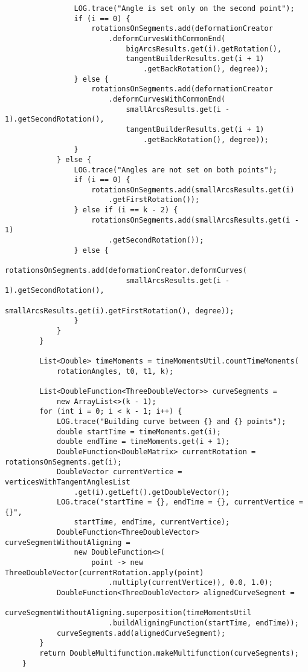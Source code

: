 \begin{verbatim}
                LOG.trace("Angle is set only on the second point");
                if (i == 0) {
                    rotationsOnSegments.add(deformationCreator
                        .deformCurvesWithCommonEnd(
                            bigArcsResults.get(i).getRotation(),
                            tangentBuilderResults.get(i + 1)
                                .getBackRotation(), degree));
                } else {
                    rotationsOnSegments.add(deformationCreator
                        .deformCurvesWithCommonEnd(
                            smallArcsResults.get(i - 1).getSecondRotation(),
                            tangentBuilderResults.get(i + 1)
                                .getBackRotation(), degree));
                }
            } else {
                LOG.trace("Angles are not set on both points");
                if (i == 0) {
                    rotationsOnSegments.add(smallArcsResults.get(i)
                        .getFirstRotation());
                } else if (i == k - 2) {
                    rotationsOnSegments.add(smallArcsResults.get(i - 1)
                        .getSecondRotation());
                } else {
                    rotationsOnSegments.add(deformationCreator.deformCurves(
                            smallArcsResults.get(i - 1).getSecondRotation(),
                            smallArcsResults.get(i).getFirstRotation(), degree));
                }
            }
        }

        List<Double> timeMoments = timeMomentsUtil.countTimeMoments(
            rotationAngles, t0, t1, k);

        List<DoubleFunction<ThreeDoubleVector>> curveSegments =
            new ArrayList<>(k - 1);
        for (int i = 0; i < k - 1; i++) {
            LOG.trace("Building curve between {} and {} points");
            double startTime = timeMoments.get(i);
            double endTime = timeMoments.get(i + 1);
            DoubleFunction<DoubleMatrix> currentRotation = rotationsOnSegments.get(i);
            DoubleVector currentVertice = verticesWithTangentAnglesList
                .get(i).getLeft().getDoubleVector();
            LOG.trace("startTime = {}, endTime = {}, currentVertice = {}",
                startTime, endTime, currentVertice);
            DoubleFunction<ThreeDoubleVector> curveSegmentWithoutAligning =
                new DoubleFunction<>(
                    point -> new ThreeDoubleVector(currentRotation.apply(point)
                        .multiply(currentVertice)), 0.0, 1.0);
            DoubleFunction<ThreeDoubleVector> alignedCurveSegment =
                    curveSegmentWithoutAligning.superposition(timeMomentsUtil
                        .buildAligningFunction(startTime, endTime));
            curveSegments.add(alignedCurveSegment);
        }
        return DoubleMultifunction.makeMultifunction(curveSegments);
    }


\end{verbatim}
